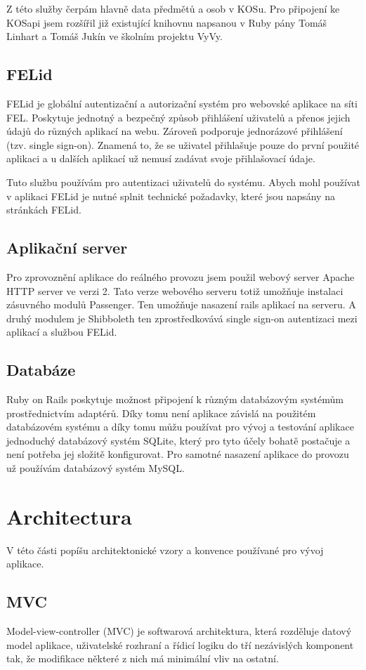 Z této služby čerpám hlavně data předmětů a osob v KOSu. Pro připojení ke KOSapi jsem rozšířil již existující knihovnu napsanou v Ruby pány Tomáš Linhart a Tomáš Jukín ve školním projektu VyVy. 

\subsection{FELid}
FELid je globální autentizační a autorizační systém pro webovské aplikace na síti FEL. Poskytuje jednotný a bezpečný způsob přihlášení uživatelů a přenos jejich údajů do různých aplikací na webu. Zároveň podporuje jednorázové přihlášení (tzv. single sign-on). Znamená to, že se uživatel přihlašuje pouze do první použité aplikaci a u dalších aplikací už nemusí zadávat svoje přihlašovací údaje.

Tuto službu používám pro autentizaci uživatelů do systému. Abych mohl používat v aplikaci FELid je nutné splnit technické požadavky, které jsou napsány na stránkách FELid.

\subsection{Aplikační server}
Pro zprovoznění aplikace do reálného provozu jsem použil webový server Apache HTTP server ve verzi 2. Tato verze webového serveru totiž umožňuje instalaci zásuvného modulů Passenger. Ten umožňuje nasazení rails aplikací na serveru. A druhý modulem je Shibboleth ten zprostředkovává single sign-on autentizaci mezi aplikací a službou FELid.

\subsection{Databáze}
Ruby on Rails poskytuje možnost připojení k různým databázovým systémům prostřednictvím adaptérů. Díky tomu není aplikace závislá na použitém databázovém systému a díky tomu můžu používat pro vývoj a testování aplikace jednoduchý databázový systém SQLite, který pro tyto účely bohatě postačuje a není potřeba jej složitě konfigurovat. Pro samotné nasazení aplikace do provozu už používám databázový systém MySQL.

\section{Architectura}
V této části popíšu architektonické vzory a konvence používané pro vývoj aplikace. 

\subsection{MVC}
Model-view-controller (MVC) je softwarová architektura, která rozděluje datový model aplikace, uživatelské rozhraní a řídicí logiku do tří nezávislých komponent tak, že modifikace některé z nich má minimální vliv na ostatní. 

